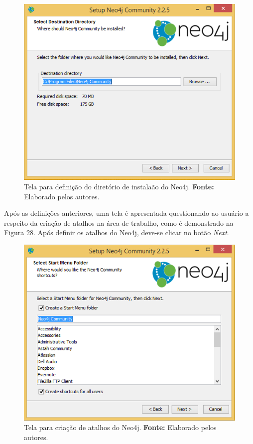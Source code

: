\begin{figure}[h!]
	\centerline{\includegraphics[scale=0.4]{./imagens/neo4j-install-step3.png}}
	\caption[Tela para definição do diretório de instalaão do Neo4j]
	{Tela para definição do diretório de instalaão do Neo4j. \textbf{Fonte:} Elaborado pelos autores.}
	\label{fig:exemplo1}
\end{figure}

\par Após as definições anteriores, uma tela é apresentada questionando ao usuário a respeito da criação de atalhos na área de trabalho, como é demonstrado na Figura 28. Após definir os atalhos do Neo4j, deve-se clicar no botão \textit{Next}.

\begin{figure}[h!]
	\centerline{\includegraphics[scale=0.4]{./imagens/neo4j-install-step4.png}}
	\caption[Tela para criação de atalhos do Neo4j]
	{Tela para criação de atalhos do Neo4j. \textbf{Fonte:} Elaborado pelos autores.}
	\label{fig:exemplo1}
\end{figure}

